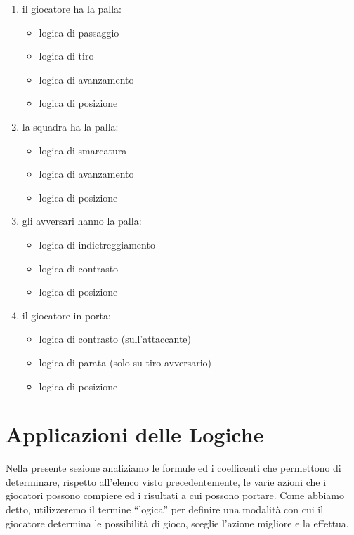 \documentclass[aps,letterpaper,10pt]{article}
\begin{document}
\begin{enumerate}
	\item il giocatore ha la palla:
		\begin{itemize}
			\item logica di passaggio
			\item logica di tiro
			\item logica di avanzamento
			\item logica di posizione
		\end{itemize}
	\item la squadra ha la palla:
		\begin{itemize}
			\item logica di smarcatura
			\item logica di avanzamento
			\item logica di posizione
		\end{itemize}
	\item gli avversari hanno la palla:
		\begin{itemize}
			\item logica di indietreggiamento
			\item logica di contrasto
			\item logica di posizione
		\end{itemize}
	\item il giocatore in porta:
		\begin{itemize}
			\item logica di contrasto (sull'attaccante)
			\item logica di parata (solo su tiro avversario)
			\item logica di posizione
		\end{itemize}
\end{enumerate}

\newpage

\section{Applicazioni delle Logiche}

Nella presente sezione analiziamo le formule ed i coefficenti che permettono di determinare, rispetto all'elenco visto precedentemente, le varie azioni che i giocatori possono compiere ed i risultati a cui possono portare. Come abbiamo detto, utilizzeremo il termine ``logica'' per definire una modalit\`a con cui il giocatore determina le possibilit\`a di gioco, sceglie l'azione migliore e la effettua. \vspace{3mm}
\end{document}
